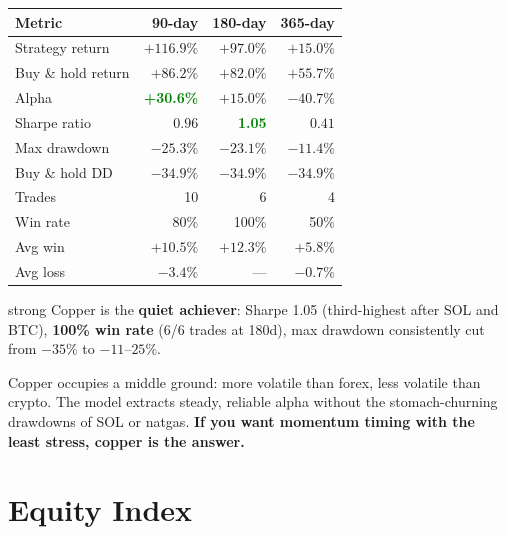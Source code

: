 \documentclass[11pt,a4paper]{article}
\begin{document}
\vspace{0.5em}
\begin{tabular}{@{}lrrr@{}}
    \toprule
    \textbf{Metric} & \textbf{90-day} & \textbf{180-day} & \textbf{365-day} \\
    \midrule
    Strategy return    & $+116.9\%$ & $+97.0\%$  & $+15.0\%$  \\
    Buy \& hold return & $+86.2\%$  & $+82.0\%$  & $+55.7\%$  \\
    Alpha              & \textcolor{green}{\textbf{+30.6\%}} & $+15.0\%$ & $-40.7\%$ \\
    Sharpe ratio       & $0.96$     & \textcolor{green}{\textbf{1.05}} & $0.41$ \\
    Max drawdown       & $-25.3\%$  & $-23.1\%$  & $-11.4\%$  \\
    Buy \& hold DD     & $-34.9\%$  & $-34.9\%$  & $-34.9\%$  \\
    Trades             & 10         & 6          & 4          \\
    Win rate           & 80\%       & 100\%      & 50\%       \\
    Avg win            & $+10.5\%$  & $+12.3\%$  & $+5.8\%$   \\
    Avg loss           & $-3.4\%$   & ---        & $-0.7\%$   \\
    \bottomrule
\end{tabular}

\begin{resultbox}{strong}
Copper is the \textbf{quiet achiever}: Sharpe 1.05 (third-highest
after SOL and BTC), \textbf{100\% win rate} (6/6 trades at 180d),
max drawdown consistently cut from $-35\%$ to $-11$--$25\%$.

Copper occupies a middle ground: more volatile than forex, less
volatile than crypto. The model extracts steady, reliable alpha
without the stomach-churning drawdowns of SOL or natgas.
\textbf{If you want momentum timing with the least stress, copper
is the answer.}
\end{resultbox}

\newpage


\part{Equity Index}
\end{document}
